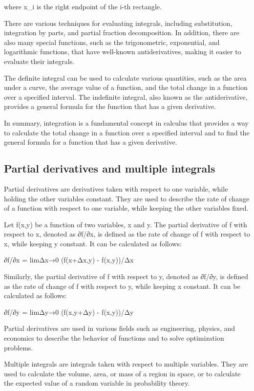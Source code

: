 \documentclass[12pt, a4paper, oneside]{article}
\begin{document}
where x_i is the right endpoint of the i-th rectangle.

There are various techniques for evaluating integrals, including substitution, integration by parts, and partial fraction decomposition. In addition, there are also many special functions, such as the trigonometric, exponential, and logarithmic functions, that have well-known antiderivatives, making it easier to evaluate their integrals.

The definite integral can be used to calculate various quantities, such as the area under a curve, the average value of a function, and the total change in a function over a specified interval. The indefinite integral, also known as the antiderivative, provides a general formula for the function that has a given derivative.

In summary, integration is a fundamental concept in calculus that provides a way to calculate the total change in a function over a specified interval and to find the general formula for a function that has a given derivative.




\subsection{ Partial derivatives and multiple integrals }
Partial derivatives are derivatives taken with respect to one variable, while holding the other variables constant. They are used to describe the rate of change of a function with respect to one variable, while keeping the other variables fixed.

Let f(x,y) be a function of two variables, x and y. The partial derivative of f with respect to x, denoted as ∂f/∂x, is defined as the rate of change of f with respect to x, while keeping y constant. It can be calculated as follows:

∂f/∂x = limΔx→0 (f(x+Δx,y) - f(x,y))/Δx

Similarly, the partial derivative of f with respect to y, denoted as ∂f/∂y, is defined as the rate of change of f with respect to y, while keeping x constant. It can be calculated as follows:

∂f/∂y = limΔy→0 (f(x,y+Δy) - f(x,y))/Δy

Partial derivatives are used in various fields such as engineering, physics, and economics to describe the behavior of functions and to solve optimization problems.

Multiple integrals are integrals taken with respect to multiple variables. They are used to calculate the volume, area, or mass of a region in space, or to calculate the expected value of a random variable in probability theory.
\end{document}
